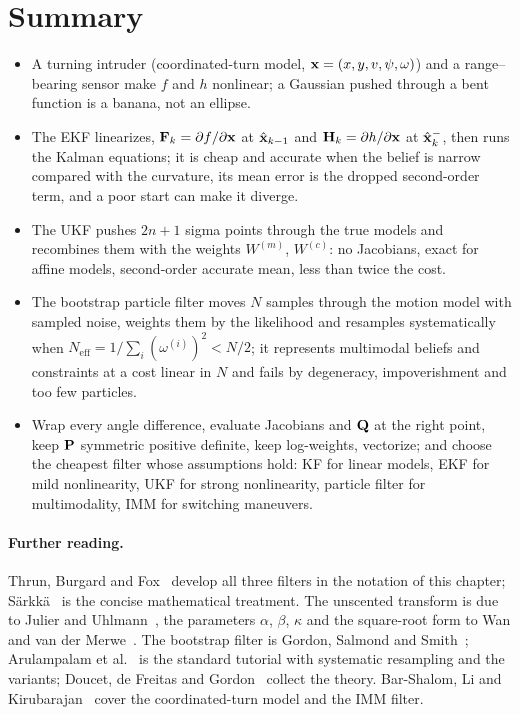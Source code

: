 \section{Summary}
\begin{summary}
\begin{itemize}
  \item A turning intruder (coordinated-turn model, $\mathbf{x} = (x, y, v,
  \psi, \omega)$) and a range--bearing sensor make $f$ and $h$ nonlinear;
  a Gaussian pushed through a bent function is a banana, not an ellipse.
  \item The EKF linearizes, $\mathbf{F}_k = \partial f/\partial\mathbf{x}$ at
  $\hat{\mathbf{x}}_{k-1}$ and $\mathbf{H}_k = \partial h/\partial\mathbf{x}$ at
  $\hat{\mathbf{x}}_k^-$, then runs the Kalman equations; it is cheap and
  accurate when the belief is narrow compared with the curvature, its mean
  error is the dropped second-order term, and a poor start can make it
  diverge.
  \item The UKF pushes $2n + 1$ sigma points through the true models and
  recombines them with the weights $W^{(m)}$, $W^{(c)}$: no Jacobians, exact
  for affine models, second-order accurate mean, less than twice the cost.
  \item The bootstrap particle filter moves $N$ samples through the motion
  model with sampled noise, weights them by the likelihood and resamples
  systematically when $N_{\mathrm{eff}} = 1/\sum_i (\omega^{(i)})^2 < N/2$; it
  represents multimodal beliefs and constraints at a cost linear in $N$ and
  fails by degeneracy, impoverishment and too few particles.
  \item Wrap every angle difference, evaluate Jacobians and $\mathbf{Q}$ at the
  right point, keep $\mathbf{P}$ symmetric positive definite, keep log-weights,
  vectorize; and choose the cheapest filter whose assumptions hold: KF for
  linear models, EKF for mild nonlinearity, UKF for strong nonlinearity,
  particle filter for multimodality, IMM for switching maneuvers.
\end{itemize}
\end{summary}

\paragraph{Further reading.}
Thrun, Burgard and Fox~\cite{thrun2005probabilistic} develop all three
filters in the notation of this chapter; S\"arkk\"a~\cite{sarkka2013bayesian}
is the concise mathematical treatment. The unscented transform is due to Julier and
Uhlmann~\cite{julier1997new,julier2004unscented}, the parameters $\alpha$,
$\beta$, $\kappa$ and the square-root form to Wan and van der
Merwe~\cite{wan2000unscented}. The bootstrap filter is Gordon, Salmond and
Smith~\cite{gordon1993novel}; Arulampalam et
al.~\cite{arulampalam2002tutorial} is the standard tutorial with systematic
resampling and the variants; Doucet, de Freitas and
Gordon~\cite{doucet2001sequential} collect the theory. Bar-Shalom, Li and
Kirubarajan~\cite{barshalom2001estimation} cover the coordinated-turn model
and the IMM filter.

